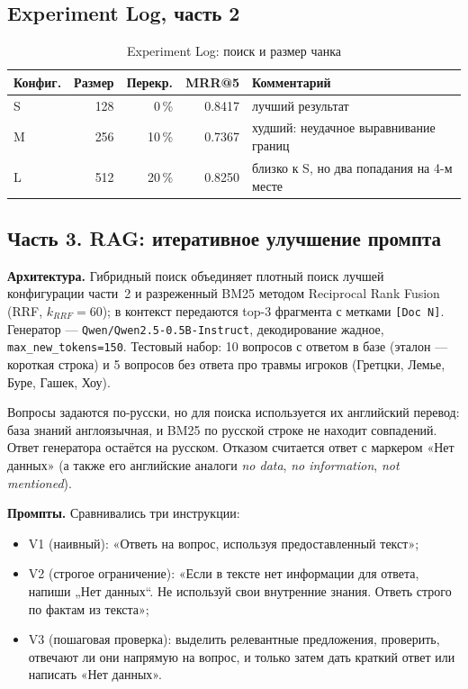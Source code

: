 \documentclass[14pt,a4paper]{extarticle}
\begin{document}
\subsection*{Experiment Log, часть 2}

\begin{table}[H]
    \centering
    \caption*{\raggedleft Experiment Log: поиск и размер чанка}
    \label{tab:log2}
    \small
    \setlength{\tabcolsep}{6pt}
    \begin{tabular}{lrrr>{\raggedright\arraybackslash}p{}}
        \toprule
        Конфиг. & Размер & Перекр. & MRR@5 & Комментарий \\
        \midrule
        S & 128 & 0\,\%  & 0.8417 & лучший результат \\
        M & 256 & 10\,\% & 0.7367 & худший: неудачное выравнивание границ \\
        L & 512 & 20\,\% & 0.8250 & близко к S, но два попадания на 4-м месте \\
        \bottomrule
    \end{tabular}
\end{table}

\subsection{Часть 3. RAG: итеративное улучшение промпта}

\textbf{Архитектура.} Гибридный поиск объединяет плотный поиск лучшей
конфигурации части~2 и разреженный BM25 методом Reciprocal Rank Fusion (RRF,
$k_{RRF}=60$); в контекст передаются top-3 фрагмента с метками \texttt{[Doc N]}.
Генератор --- \texttt{Qwen/Qwen2.5-0.5B-Instruct}, декодирование жадное,
\texttt{max\_new\_tokens=150}. Тестовый набор: 10 вопросов с ответом в базе
(эталон --- короткая строка) и 5 вопросов без ответа про травмы игроков
(Гретцки, Лемье, Буре, Гашек, Хоу).

Вопросы задаются по-русски, но для поиска используется их английский перевод:
база знаний англоязычная, и BM25 по русской строке не находит совпадений.
Ответ генератора остаётся на русском. Отказом считается ответ с маркером
«Нет данных» (а также его английские аналоги \textit{no data},
\textit{no information}, \textit{not mentioned}).

\textbf{Промпты.} Сравнивались три инструкции:
\begin{itemize}
    \item V1 (наивный): «Ответь на вопрос, используя предоставленный текст»;
    \item V2 (строгое ограничение): «Если в тексте нет информации для ответа,
          напиши „Нет данных“. Не используй свои внутренние знания. Ответь
          строго по фактам из текста»;
    \item V3 (пошаговая проверка): выделить релевантные предложения, проверить,
          отвечают ли они напрямую на вопрос, и только затем дать краткий ответ
          или написать «Нет данных».
\end{itemize}
\end{document}
